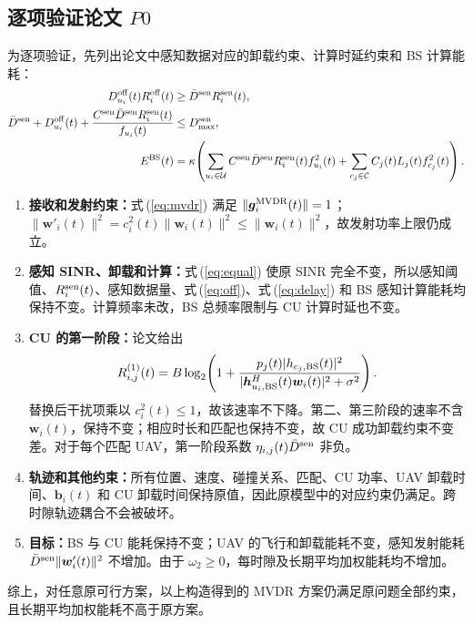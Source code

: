 \documentclass[11pt,a4paper]{ctexart}
\begin{document}
\subsection{逐项验证论文 $P0$}
为逐项验证，先列出论文中感知数据对应的卸载约束、计算时延约束和 BS 计算能耗：
\begin{align}
D_{u_i}^{\rm off}(t)R_i^{\rm off}(t)&\ge\bar D^{\rm sen}R_i^{\rm sen}(t),\label{eq:off}\\
\bar D^{\rm sen}+D_{u_i}^{\rm off}(t)
+\frac{C^{\rm sen}\bar D^{\rm sen}R_i^{\rm sen}(t)}{f_{u_i}(t)}
&\le D_{\max}^{\rm sen},\label{eq:delay}\\
E^{\rm BS}(t)&=\kappa\!\left(\sum_{u_i\in\mathcal U}
C^{\rm sen}\bar D^{\rm sen}R_i^{\rm sen}(t)f_{u_i}^2(t)
+\sum_{c_j\in\mathcal C}C_j(t)L_j(t)f_{c_j}^2(t)\right).\label{eq:bs}
\end{align}
\begin{enumerate}[label=\textbf{(\arabic*)},leftmargin=*]
\item \textbf{接收和发射约束：}式\,(\ref{eq:mvdr}) 满足 $\|\bm g_i^{\rm MVDR}(t)\|=1$；$\|\bm w'_i(t)\|^2=c_i^2(t)\|\bm w_i(t)\|^2\le\|\bm w_i(t)\|^2$，故发射功率上限仍成立。
\item \textbf{感知 SINR、卸载和计算：}式\,(\ref{eq:equal}) 使原 SINR 完全不变，所以感知阈值、$R_i^{\rm sen}(t)$、感知数据量、式\,(\ref{eq:off})、式\,(\ref{eq:delay}) 和 BS 感知计算能耗均保持不变。计算频率未改，BS 总频率限制与 CU 计算时延也不变。
\item \textbf{CU 的第一阶段：}论文给出
\[R_{i,j}^{(1)}(t)=B\log_2\!\left(1+\frac{p_j(t)|h_{c_j,\rm BS}(t)|^2}{|\bm h_{u_i,\rm BS}^H(t)\bm w_i(t)|^2+\sigma^2}\right).\]
替换后干扰项乘以 $c_i^2(t)\le1$，故该速率不下降。第二、第三阶段的速率不含 $\bm w_i(t)$，保持不变；相应时长和匹配也保持不变，故 CU 成功卸载约束不变差。对于每个匹配 UAV，第一阶段系数 $\eta_{i,j}(t)\bar D^{\rm sen}$ 非负。
\item \textbf{轨迹和其他约束：}所有位置、速度、碰撞关系、匹配、CU 功率、UAV 卸载时间、$\bm b_i(t)$ 和 CU 卸载时间保持原值，因此原模型中的对应约束仍满足。跨时隙轨迹耦合不会被破坏。
\item \textbf{目标：}BS 与 CU 能耗保持不变；UAV 的飞行和卸载能耗不变，感知发射能耗 $\bar D^{\rm sen}\|\bm w'_i(t)\|^2$ 不增加。由于 $\omega_2\ge0$，每时隙及长期平均加权能耗均不增加。
\end{enumerate}
综上，对任意原可行方案，以上构造得到的 MVDR 方案仍满足原问题全部约束，且长期平均加权能耗不高于原方案。
\end{document}
